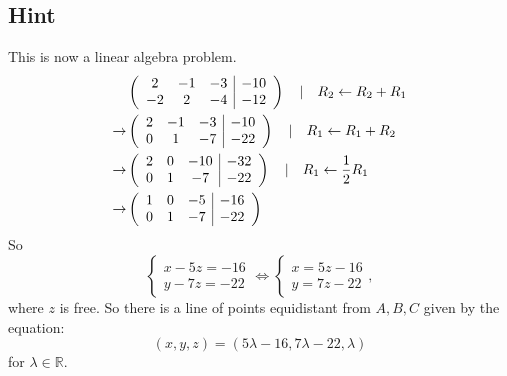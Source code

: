 \documentclass[a4paper,10pt]{article}
\begin{document}
\subsection{Hint}
This is now a linear algebra problem.
\begin{align*}
     & \left(
    \begin{array}{c c c|c}
            2  & -1 & -3 & -10 \\
            -2 & 2  & -4 & -12 \\
        \end{array}
    \right) \quad | \quad R_2 \leftarrow R_2 + R_1       \\ \rightarrow
     & \left(
    \begin{array}{c c c|c}
            2 & -1 & -3 & -10 \\
            0 & 1  & -7 & -22 \\
        \end{array}
    \right) \quad | \quad R_1 \leftarrow R_1 + R_2       \\ \rightarrow
     & \left(
    \begin{array}{c c c|c}
            2 & 0 & -10 & -32 \\
            0 & 1 & -7  & -22 \\
        \end{array}
    \right) \quad | \quad R_1 \leftarrow \frac{1}{2} R_1 \\ \rightarrow
     & \left(
    \begin{array}{c c c|c}
            1 & 0 & -5 & -16 \\
            0 & 1 & -7 & -22 \\
        \end{array}
    \right)
\end{align*}
So
\[
    \begin{cases}
        x - 5z = -16 \\
        y - 7z = -22
    \end{cases} \iff \begin{cases}
        x = 5z - 16 \\
        y = 7z - 22
    \end{cases},
\]
where $z$ is free. So there is a line of points equidistant from $A, B, C$ given by the equation:
\[
    (x, y, z) = (5\lambda - 16, 7\lambda - 22, \lambda)
\]
for $\lambda\in\mathbb{R}$.
\end{document}
